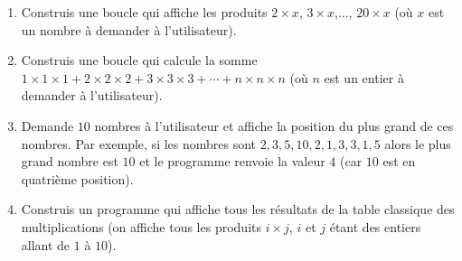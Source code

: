 \documentclass[class=report,crop=false, 12pt]{standalone}
\begin{document}
\bigskip

\begin{activite}
\sauteligne
\begin{enumerate}
  \item Construis une boucle qui affiche les produits $2\times x$, $3\times x$,..., $20 \times x$ (où $x$ est un nombre à demander à l'utilisateur).
     
  \item Construis une boucle qui calcule la somme $1\times 1 \times 1 + 2\times 2 \times 2 + 3\times 3 \times 3 + \cdots
+ n \times n \times n$ (où $n$ est un entier à demander à l'utilisateur).  
  
  \item Demande $10$ nombres à l'utilisateur et affiche la position du plus grand de ces nombres.
  Par exemple, si les nombres sont $2,3,5,10,2,1,3,3,1,5$ alors le plus grand nombre est $10$ et le programme renvoie la valeur $4$ (car $10$ est en quatrième position). 
  
  \item Construis un programme qui affiche tous les résultats de la table classique des multiplications
  (on affiche tous les produits $i \times j$, $i$ et $j$ étant des entiers allant de $1$ à $10$).
  
\end{enumerate}

\end{activite}
\end{document}
